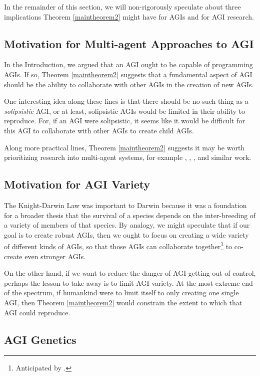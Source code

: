 \documentclass[runningheads]{llncs}
\begin{document}
In the remainder of this section, we will non-rigorously speculate about three implications
Theorem \ref{maintheorem2} might have for AGIs and for AGI research.


\subsection{Motivation for Multi-agent Approaches to AGI}

In the Introduction, we argued that an AGI ought to be
capable of programming AGIs. If so, Theorem \ref{maintheorem2} suggests
that a fundamental aspect of AGI should be the ability to collaborate with other
AGIs in the creation of new AGIs.

One interesting idea along these lines is that there should be no
such thing as a \emph{solipsistic} AGI, or at least, solipsistic AGIs would be
limited in their ability to reproduce.
For, if an AGI were solipsistic, it
seems like it would be difficult for this AGI to collaborate with other AGIs
to create child AGIs.

Along more practical lines, Theorem \ref{maintheorem2} suggests it may be worth
prioritizing research into multi-agent systems, for example
\cite{bansal2017emergent}, \cite{hibbard2011societies}, \cite{lazaridou2018emergence},
and similar work.

\subsection{Motivation for AGI Variety}

The Knight-Darwin Law was important to
Darwin because it was a foundation for a broader thesis that the survival of a
species depends on the inter-breeding of a variety of members of that species.
By analogy, we might speculate that if our goal is to create robust AGIs, then
we ought to focus on creating a wide variety of different kinds of AGIs, so that
those AGIs can collaborate together\footnote{Anticipated
by \cite{dai2011artificial}.} to co-create even stronger AGIs.

On the other hand, if we want to reduce the danger of AGI getting out of control,
perhaps the lesson to take away is to limit AGI variety. At the most extreme end
of the spectrum, if humankind were to limit itself to only creating one single
AGI, then Theorem \ref{maintheorem2} would constrain the extent to which
that AGI could reproduce.


\subsection{AGI Genetics}
\end{document}
